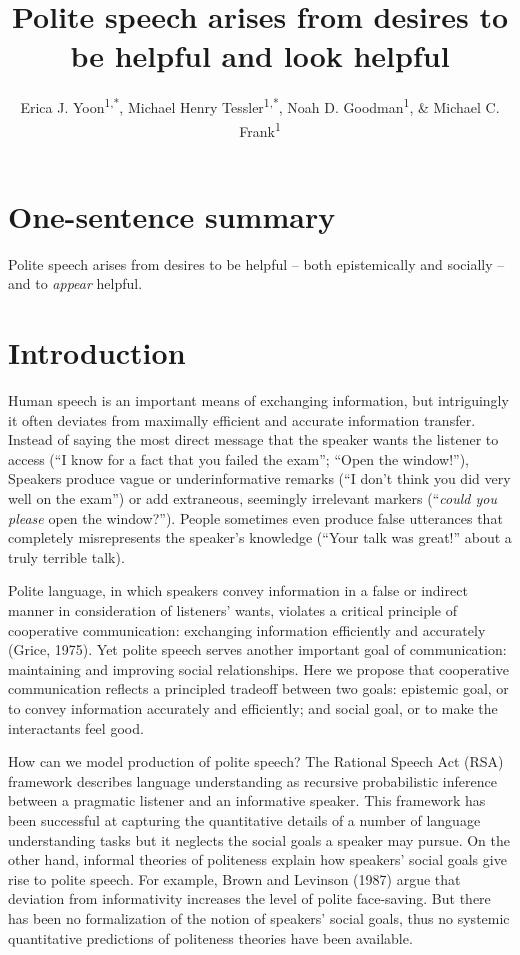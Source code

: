 \documentclass[english,floatsintext,man]{apa6}
\title{Polite speech arises from desires to be helpful and look helpful}
\author{Erica J. Yoon\textsuperscript{1,*}, Michael Henry Tessler\textsuperscript{1,*}, Noah D. Goodman\textsuperscript{1}, \& Michael C. Frank\textsuperscript{1}}
\affiliation{
    \vspace{0.5cm}
          \textsuperscript{1} Department of Psychology, Stanford University\\
          \textsuperscript{*} These authors contributed equally to this work.  }
\theoremstyle{definition}
\theoremstyle{definition}
\theoremstyle{definition}
\theoremstyle{remark}
\begin{document}
\maketitle

\setcounter{secnumdepth}{0}



\hypertarget{one-sentence-summary}{%
\section{One-sentence summary}\label{one-sentence-summary}}

Polite speech arises from desires to be helpful -- both epistemically
and socially -- and to \emph{appear} helpful.

\hypertarget{introduction}{%
\section{Introduction}\label{introduction}}

Human speech is an important means of exchanging information, but
intriguingly it often deviates from maximally efficient and accurate
information transfer. Instead of saying the most direct message that the
speaker wants the listener to access (\enquote{I know for a fact that
you failed the exam}; \enquote{Open the window!}), Speakers produce
vague or underinformative remarks (\enquote{I don't think you did very
well on the exam}) or add extraneous, seemingly irrelevant markers
(\enquote{\emph{could you please} open the window?}). People sometimes
even produce false utterances that completely misrepresents the
speaker's knowledge (\enquote{Your talk was great!} about a truly
terrible talk).

Polite language, in which speakers convey information in a false or
indirect manner in consideration of listeners' wants, violates a
critical principle of cooperative communication: exchanging information
efficiently and accurately (Grice, 1975). Yet polite speech serves
another important goal of communication: maintaining and improving
social relationships. Here we propose that cooperative communication
reflects a principled tradeoff between two goals: epistemic goal, or to
convey information accurately and efficiently; and social goal, or to
make the interactants feel good.

How can we model production of polite speech? The Rational Speech Act
(RSA) framework describes language understanding as recursive
probabilistic inference between a pragmatic listener and an informative
speaker. This framework has been successful at capturing the
quantitative details of a number of language understanding tasks but it
neglects the social goals a speaker may pursue. On the other hand,
informal theories of politeness explain how speakers' social goals give
rise to polite speech. For example, Brown and Levinson (1987) argue that
deviation from informativity increases the level of polite face-saving.
But there has been no formalization of the notion of speakers' social
goals, thus no systemic quantitative predictions of politeness theories
have been available.
\end{document}
